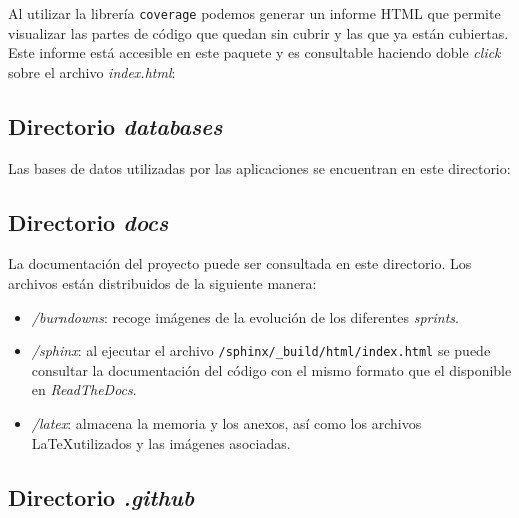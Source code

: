 Al utilizar la librería \texttt{coverage} podemos generar un informe HTML que permite visualizar las partes de código que quedan sin cubrir y las que ya están cubiertas. Este informe está accesible en este paquete y es consultable haciendo doble \emph{click} sobre el archivo \emph{index.html}:



\subsection{Directorio \emph{databases}}

Las bases de datos utilizadas por las aplicaciones se encuentran en este directorio:



\subsection{Directorio \emph{docs}}

La documentación del proyecto puede ser consultada en este directorio. Los archivos están distribuidos de la siguiente manera:

\begin{itemize}
\tightlist
\item
\emph{/burndowns}: recoge imágenes de la evolución de los diferentes \emph{sprints}.
\item
\emph{/sphinx}: al ejecutar el archivo \texttt{/sphinx/\_build/html/index.html} se puede consultar la documentación del código con el mismo formato que el disponible en \emph{ReadTheDocs}.
\item
\emph{/latex}: almacena la memoria y los anexos, así como los archivos \LaTeX utilizados y las imágenes asociadas.
\end{itemize}



\subsection{Directorio \emph{.github}}
